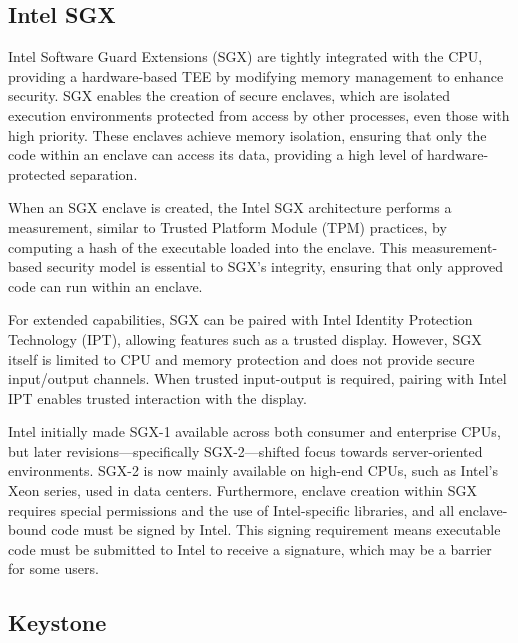 \subsection{Intel SGX}

Intel Software Guard Extensions (SGX) are tightly integrated with the
CPU, providing a hardware-based TEE by modifying memory management to
enhance security. SGX enables the creation of secure enclaves, which
are isolated execution environments protected from access by other
processes, even those with high priority. These enclaves achieve
memory isolation, ensuring that only the code within an enclave can
access its data, providing a high level of hardware-protected
separation.

When an SGX enclave is created, the Intel SGX architecture performs a
measurement, similar to Trusted Platform Module (TPM) practices, by
computing a hash of the executable loaded into the enclave. This
measurement-based security model is essential to SGX’s integrity,
ensuring that only approved code can run within an enclave.

For extended capabilities, SGX can be paired with Intel Identity
Protection Technology (IPT), allowing features such as a trusted
display. However, SGX itself is limited to CPU and memory protection
and does not provide secure input/output channels. When trusted
input-output is required, pairing with Intel IPT enables trusted
interaction with the display.

Intel initially made SGX-1 available across both consumer and
enterprise CPUs, but later revisions—specifically SGX-2—shifted focus
towards server-oriented environments. SGX-2 is now mainly available on
high-end CPUs, such as Intel’s Xeon series, used in data centers.
Furthermore, enclave creation within SGX requires special permissions
and the use of Intel-specific libraries, and all enclave-bound code
must be signed by Intel. This signing requirement means executable
code must be submitted to Intel to receive a signature, which may be a
barrier for some users.

\subsection{Keystone}

